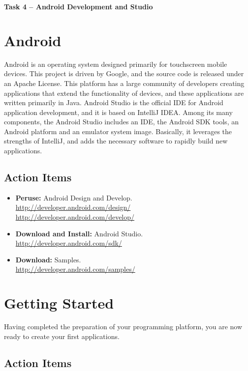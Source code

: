 \documentclass[11pt]{article}
\begin{document}
\begin{center}
{\bfseries \LARGE Task 4 -- Android Development and Studio}
\end{center}


\section{Android}

Android is an operating system designed primarily for touchscreen mobile devices.
This project is driven by Google, and the source code is released under an Apache License.
This platform has a large community of developers creating applications that extend the functionality of devices, and these applications are written primarily in Java.
Android Studio is the official IDE for Android application development, and it is based on IntelliJ IDEA.
Among its many components, the Android Studio includes an IDE, the Android SDK tools, an Android platform and an emulator system image.
Basically, it leverages the strengths of IntelliJ, and adds the necessary software to rapidly build new applications.

\subsection*{Action Items}

\begin{itemize}
\item \textbf{Peruse:} Android Design and Develop.\\
\url{http://developer.android.com/design/} \\
\url{http://developer.android.com/develop/}
\item \textbf{Download and Install:} Android Studio.\\
\url{http://developer.android.com/sdk/}
\item \textbf{Download:} Samples.\\
\url{http://developer.android.com/samples/}
\end{itemize}


\section{Getting Started}

Having completed the preparation of your programming platform, you are now ready to create your first applications.

\subsection*{Action Items}
\end{document}
